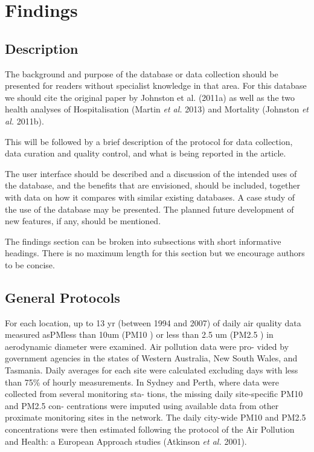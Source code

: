 \section{Findings}\label{findings}

\subsection{Description}\label{description}

The background and purpose of the database or data collection should be
presented for readers without specialist knowledge in that area. For
this database we should cite the original paper by Johnston et al.
(2011a) as well as the two health analyses of Hospitalisation (Martin
\emph{et al.} 2013) and Mortality (Johnston \emph{et al.} 2011b).

This will be followed by a brief description of the protocol for data
collection, data curation and quality control, and what is being
reported in the article.

The user interface should be described and a discussion of the intended
uses of the database, and the benefits that are envisioned, should be
included, together with data on how it compares with similar existing
databases. A case study of the use of the database may be presented. The
planned future development of new features, if any, should be mentioned.

The findings section can be broken into subsections with short
informative headings. There is no maximum length for this section but we
encourage authors to be concise.

\subsection{General Protocols}\label{general-protocols}

For each location, up to 13 yr (between 1994 and 2007) of daily air
quality data measured asPMless than 10um (PM10 ) or less than 2.5 um
(PM2.5 ) in aerodynamic diameter were examined. Air pollution data were
pro- vided by government agencies in the states of Western Australia,
New South Wales, and Tasmania. Daily averages for each site were
calculated excluding days with less than 75\% of hourly measurements. In
Sydney and Perth, where data were collected from several monitoring sta-
tions, the missing daily site-specific PM10 and PM2.5 con- centrations
were imputed using available data from other proximate monitoring sites
in the network. The daily city-wide PM10 and PM2.5 concentrations were
then estimated following the protocol of the Air Pollution and Health: a
European Approach studies (Atkinson \emph{et al.} 2001).

